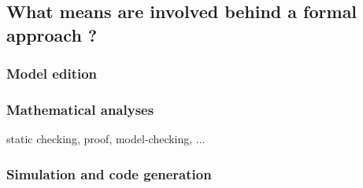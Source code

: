 \subsection{What means are involved behind a formal approach ?}

\subsubsection{Model edition}

\subsubsection{Mathematical analyses}
static checking, proof, model-checking, ...

\subsubsection{Simulation and code generation}

